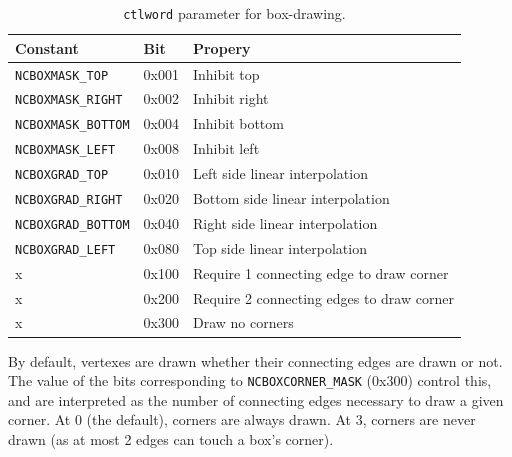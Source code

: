 \documentclass[letterpaper,10pt]{article}
\begin{document}
\begin{table}[!htb]
  \centering
  \begin{tabular}{|l|l|l|}
    \hline
    Constant & Bit & Propery \\
    \hline
    \hline
    \texttt{NCBOXMASK\_TOP} & 0x001 & Inhibit top \\
    \hline
    \texttt{NCBOXMASK\_RIGHT} & 0x002 & Inhibit right \\
    \hline
    \texttt{NCBOXMASK\_BOTTOM} & 0x004 & Inhibit bottom \\
    \hline
    \texttt{NCBOXMASK\_LEFT} & 0x008 & Inhibit left \\
    \hline
    \texttt{NCBOXGRAD\_TOP} & 0x010 & Left side linear interpolation \\
    \hline
    \texttt{NCBOXGRAD\_RIGHT} & 0x020 & Bottom side linear interpolation \\
    \hline
    \texttt{NCBOXGRAD\_BOTTOM} & 0x040 & Right side linear interpolation \\
    \hline
    \texttt{NCBOXGRAD\_LEFT} & 0x080 & Top side linear interpolation \\
    \hline
    x & 0x100 & Require 1 connecting edge to draw corner \\
    \hline
    x & 0x200 & Require 2 connecting edges to draw corner \\
    \hline
    x & 0x300 & Draw no corners \\
    \hline
  \end{tabular}
  \caption{\texttt{ctlword} parameter for box-drawing.}
  \label{table:boxes}
\end{table}

By default, vertexes are drawn whether their connecting edges are drawn or
not. The value of the bits corresponding to \texttt{NCBOXCORNER\_MASK} (0x300)
control this, and are interpreted as the number of connecting edges necessary to draw a
given corner. At 0 (the default), corners are always drawn. At 3, corners
are never drawn (as at most 2 edges can touch a box's corner).
\end{document}
